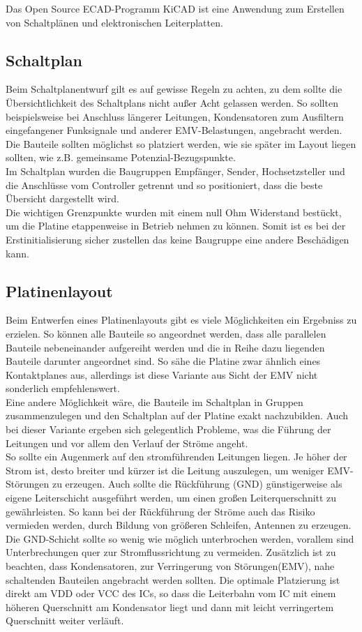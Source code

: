 
Das Open Source ECAD-Programm KiCAD ist eine Anwendung zum Erstellen von Schaltplänen und elektronischen Leiterplatten. 

\subsection{Schaltplan}
Beim Schaltplanentwurf gilt es auf gewisse Regeln zu achten, zu dem sollte die Übersichtlichkeit des Schaltplans nicht außer Acht gelassen werden.
So sollten beispielsweise bei Anschluss längerer Leitungen, Kondensatoren zum Ausfiltern eingefangener Funksignale und anderer EMV-Belastungen, angebracht werden. Die Bauteile sollten möglichst so platziert werden, wie sie später im Layout liegen sollten, wie z.B. gemeinsame Potenzial-Bezugspunkte.\\
Im Schaltplan wurden die Baugruppen Empfänger, Sender, Hochsetzsteller und die Anschlüsse vom Controller getrennt und so positioniert, dass die beste Übersicht dargestellt wird.\\
Die wichtigen Grenzpunkte wurden mit einem null Ohm Widerstand bestückt, um die Platine etappenweise in Betrieb nehmen zu können. Somit ist es bei der Erstinitialisierung
sicher zustellen das keine Baugruppe eine andere Beschädigen kann. \\   

\subsection{Platinenlayout}
Beim Entwerfen eines Platinenlayouts gibt es viele Möglichkeiten ein Ergebniss zu erzielen. So können alle Bauteile so angeordnet werden, dass alle parallelen Bauteile nebeneinander aufgereiht werden und die in Reihe dazu liegenden Bauteile darunter angeordnet sind. So sähe die Platine zwar ähnlich eines Kontaktplanes aus, allerdings ist diese Variante aus Sicht der EMV nicht sonderlich empfehlenswert.\\
Eine andere Möglichkeit wäre, die Bauteile im Schaltplan in Gruppen zusammenzulegen und den Schaltplan auf der Platine exakt nachzubilden. Auch bei dieser Variante ergeben sich gelegentlich Probleme, was die Führung der Leitungen und vor allem den Verlauf der Ströme angeht.\\
So sollte ein Augenmerk auf den stromführenden Leitungen liegen. Je höher der Strom ist, desto breiter und kürzer ist die Leitung auszulegen, um weniger EMV-Störungen zu erzeugen. Auch sollte die Rückführung (GND) günstigerweise als eigene Leiterschicht ausgeführt werden, um einen großen Leiterquerschnitt zu gewährleisten. So kann bei der Rückführung der Ströme auch das Risiko vermieden werden, durch Bildung von größeren Schleifen, Antennen zu erzeugen. Die GND-Schicht sollte so wenig wie möglich unterbrochen werden, vorallem sind Unterbrechungen quer zur Stromflussrichtung zu vermeiden. Zusätzlich ist zu beachten, dass Kondensatoren, zur Verringerung von Störungen(EMV), nahe schaltenden Bauteilen angebracht werden sollten. Die optimale Platzierung ist direkt am VDD oder VCC des ICs, so dass die Leiterbahn vom IC mit einem höheren Querschnitt am Kondensator liegt und dann mit leicht verringertem Querschnitt weiter verläuft.


